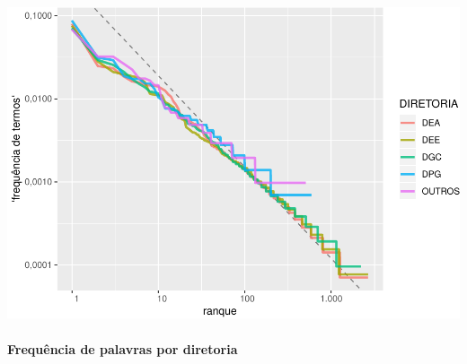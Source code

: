 \documentclass[]{article}
\let\oldparagraph\paragraph
\renewcommand{\paragraph}[1]{\oldparagraph{#1}\mbox{}}
\begin{document}
\includegraphics{markdown_v31_files/figure-latex/unnamed-chunk-30-1.pdf}

\paragraph{Frequência de palavras por
diretoria}\label{frequencia-de-palavras-por-diretoria}
\end{document}
